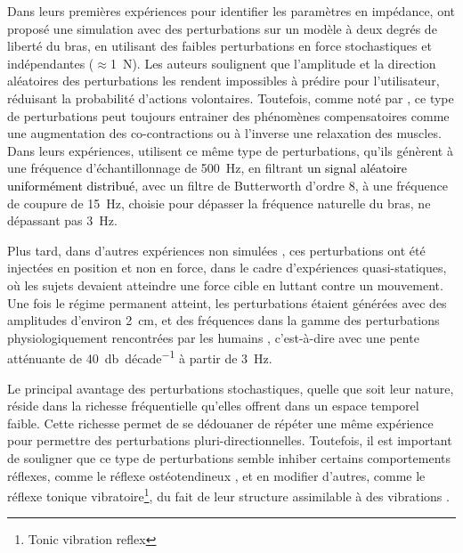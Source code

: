 Dans leurs premières expériences pour identifier les paramètres en impédance, \textcite{perreault_multiple-input_1999} ont proposé une simulation avec des perturbations sur un modèle à deux degrés de liberté du bras, en utilisant des faibles perturbations en force stochastiques et indépendantes ($\approx$\SI{1}{\newton}). Les auteurs soulignent que l'amplitude et la direction aléatoires des perturbations les rendent impossibles à prédire pour l'utilisateur, réduisant la probabilité d'actions volontaires. Toutefois, comme noté par \textcite{palazzolo_stochastic_2007}, ce type de perturbations peut toujours entrainer des phénomènes compensatoires comme une augmentation des co-contractions ou à l'inverse une relaxation des muscles. Dans leurs expériences, \textcite{palazzolo_stochastic_2007} utilisent ce même type de perturbations, qu'ils génèrent à une fréquence d'échantillonnage de \SI{500}{\hertz}, en filtrant \textcolor{black}{un signal aléatoire uniformément distribué}, avec un filtre de Butterworth d'ordre 8, à une fréquence de coupure de \SI{15}{\hertz}, choisie pour dépasser la fréquence naturelle du bras, ne dépassant pas \SI{3}{\hertz}.

Plus tard, dans d'autres expériences non simulées \parencite{perreault_effects_2001, perreault_multijoint_2004}, ces perturbations ont été injectées en position et non en force, dans le cadre d'expériences quasi-statiques, où les sujets devaient atteindre une force cible en luttant contre un mouvement. Une fois le régime permanent atteint, les perturbations étaient générées avec des amplitudes d'environ \SI{2}{\centi\meter}, et des fréquences dans la gamme des perturbations physiologiquement rencontrées par les humains \parencite{mann_frequency_1989}, c'est-à-dire avec une pente atténuante de \SI{40}{\decibel\per décade} à partir de \SI{3}{\hertz}.

Le principal avantage des perturbations stochastiques, quelle que soit leur nature, réside dans la richesse fréquentielle qu'elles offrent dans un espace temporel faible. Cette richesse permet de se dédouaner de répéter une même expérience pour permettre des perturbations pluri-directionnelles. Toutefois, il est important de souligner que ce type de perturbations semble inhiber certains comportements réflexes, comme le réflexe ostéotendineux \parencite{stein_nonlinear_1995}, et en modifier d'autres, comme le réflexe tonique vibratoire\footnote{Tonic vibration reflex}, du fait de leur structure assimilable à des vibrations \parencite{gillies_presynaptic_1969,lance_reflex_1973,agarwal_effect_1980,barrera-curiel_effects_2019}.

